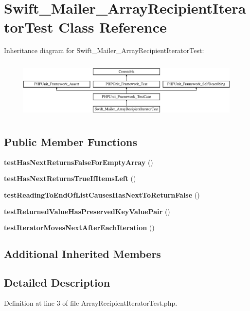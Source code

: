 \section{Swift\+\_\+\+Mailer\+\_\+\+Array\+Recipient\+Iterator\+Test Class Reference}
\label{class_swift___mailer___array_recipient_iterator_test}
Inheritance diagram for Swift\+\_\+\+Mailer\+\_\+\+Array\+Recipient\+Iterator\+Test\+:\begin{figure}[H]
\begin{center}
\leavevmode
\includegraphics[height=3.047619cm]{class_swift___mailer___array_recipient_iterator_test}
\end{center}
\end{figure}
\subsection*{Public Member Functions}
\begin{DoxyCompactItemize}
\item 
{\bf test\+Has\+Next\+Returns\+False\+For\+Empty\+Array} ()
\item 
{\bf test\+Has\+Next\+Returns\+True\+If\+Items\+Left} ()
\item 
{\bf test\+Reading\+To\+End\+Of\+List\+Causes\+Has\+Next\+To\+Return\+False} ()
\item 
{\bf test\+Returned\+Value\+Has\+Preserved\+Key\+Value\+Pair} ()
\item 
{\bf test\+Iterator\+Moves\+Next\+After\+Each\+Iteration} ()
\end{DoxyCompactItemize}
\subsection*{Additional Inherited Members}


\subsection{Detailed Description}


Definition at line 3 of file Array\+Recipient\+Iterator\+Test.\+php.



